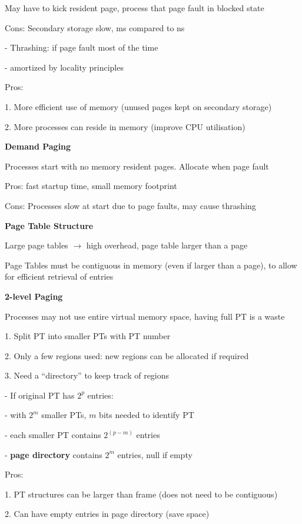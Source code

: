 \documentclass[10pt, a4paper]{article}
\newcommand{\highlight}[1]{{\color{red}\textbf{#1}}}
\newcommand{\red}[1]{{\color{red}#1}}
\newcommand{\green}[1]{{\color{ForestGreen}#1}}
\newcommand{\tab}[0]{\hspace*{2mm}}
\begin{document}
\begin{multicols*}{3}
		May have to kick resident page, process that page fault in \red{blocked} state

		\red{Cons}: Secondary storage slow, ms compared to ns

		\tab{} - \red{Thrashing}: if page fault most of the time 

		\tab{} - amortized by \green{locality principles}

		\green{Pros}:

		1. More efficient use of memory (unused pages kept on secondary storage)

		2. More processes can reside in memory (improve CPU utilisation)

		\textbf{Demand Paging}

		Processes start with \red{no memory resident} pages. Allocate when page fault

		\green{Pros}: fast startup time, small memory footprint

		\red{Cons}: Processes slow at start due to page faults, may cause thrashing

		\textbf{Page Table Structure}

		Large page tables $\rightarrow$ high overhead, page table larger than a page 

		Page Tables must be contiguous in memory (even if larger than a page), to allow for 
		efficient retrieval of entries

		\textbf{2-level Paging}

		Processes may not use entire virtual memory space, having full PT is a waste

		1. Split PT into smaller PTs with PT number

		2. Only a few regions used: new regions can be allocated if required

		3. Need a ``directory'' to keep track of regions

		- If original PT has $2^p$ entries:
		
		\tab{} - with $2^m$ smaller PTs, $m$ bits needed to identify PT

		\tab{} - each smaller PT contains $2^{(p-m)}$ entries

		\tab{} - \highlight{page directory} contains $2^m$ entries, null if empty

		\green{Pros}: 

		1. PT structures can be larger than frame (does not need to be contiguous)

		2. Can have empty entries in page directory (save space)


\end{multicols*}
\end{document}
